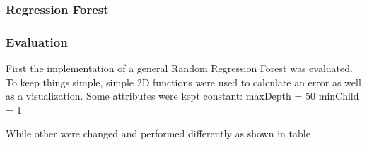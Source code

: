 \subsubsection*{Regression Forest} %
\label{ssub:regression_forest}



\subsubsection{Evaluation} %
\label{ssub:camera_relocalization}
First the implementation of a general Random Regression Forest was evaluated. To keep things simple, simple 2D functions were used to calculate an error as well as a visualization.
Some attributes were kept constant:
maxDepth = 50
minChild = 1

While other were changed and performed differently as shown in table %



